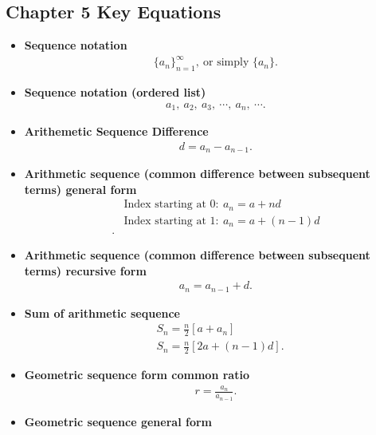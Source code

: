 \documentclass{report}
\begin{document}
    \pagebreak \bigbreak \noindent 
    \subsection{\LARGE Chapter 5 Key Equations}
    \bigbreak \noindent 
    \begin{itemize}
    \item \textbf{Sequence notation}
        \begin{align*}
            \{a_{n}\}_{n=1}^{\infty},\ \text{or simply } \{a_{n}\}
        .\end{align*}
    \item \textbf{Sequence notation (ordered list)}
        \begin{align*}
            a_{1},\ a_{2},\ a_{3},\ \cdots,\ a_{n},\ \cdots
        .\end{align*}
    \item \textbf{Arithemetic Sequence Difference}
        \begin{align*}
            d = a_{n} - a_{n-1}
        .\end{align*}
    \item \textbf{Arithmetic sequence (common difference between subsequent terms) general form}
        \begin{align*}
            &\text{Index starting at 0}:\ a_{n} = a + nd \\
            &\text{Index starting at 1}:\ a_{n} = a + (n-1)d \\
        .\end{align*}
    \item \textbf{Arithmetic sequence (common difference between subsequent terms) recursive form}
        \begin{align*}
            a_{n} = a_{n-1} + d
        .\end{align*}
    \item \textbf{Sum of arithmetic sequence}
        \begin{align*}
            &S_{n} = \frac{n}{2}\left[a + a_{n}\right] \\
            &S_{n} = \frac{n}{2}\left[2a + (n-1)d\right]
        .\end{align*}
    \item \textbf{Geometric sequence form common ratio}
        \begin{align*}
            r = \frac{a_{n}}{a_{n-1}}
        .\end{align*}
    \item \textbf{Geometric sequence general form}

\end{itemize}
\end{document}

